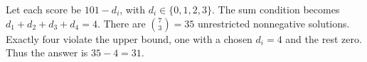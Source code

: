 Let each score be $101-d_i$, with $d_i\in\{0,1,2,3\}$. The sum condition becomes $d_1+d_2+d_3+d_4=4$. There are $\binom73=35$ unrestricted nonnegative solutions. Exactly four violate the upper bound, one with a chosen $d_i=4$ and the rest zero. Thus the answer is $35-4=\boxed{31}$.
